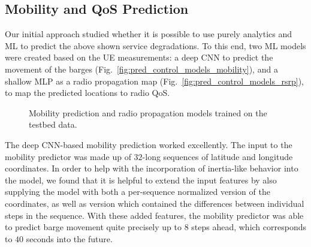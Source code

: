 		\subsection{Mobility and QoS Prediction}
	
			Our initial approach studied whether it is possible to use purely analytics and \ac{ML} to predict the above shown service degradations.
			To this end, two \ac{ML} models were created based on the \ac{UE} measurements: a deep \ac{CNN} to predict the movement of the barges (Fig.~\ref{fig:pred_control_models_mobility}), and a shallow \ac{MLP} as a radio propagation map (Fig.~\ref{fig:pred_control_models_rsrp}), to map the predicted locations to radio \ac{QoS}.
			
			\begin{figure}[!ht]
				\centering
				\caption[MPP and radio map trained on the smart seaport dataset]{Mobility prediction and radio propagation models trained on the testbed data.}
				\label{fig:fig:pred_control_models}
			\end{figure}
			
			The deep \ac{CNN}-based mobility prediction worked excellently.
			The input to the mobility predictor was made up of $32$-long sequences of latitude and longitude coordinates.
			In order to help with the incorporation of inertia-like behavior into the model, we found that it is helpful to extend the input features by also supplying the model with both a per-sequence normalized version of the coordinates, as well as version which contained the differences between individual steps in the sequence.
			With these added features, the mobility predictor was able to predict barge movement quite precisely up to $8$ steps ahead, which corresponds to $40$ seconds into the future.
			
